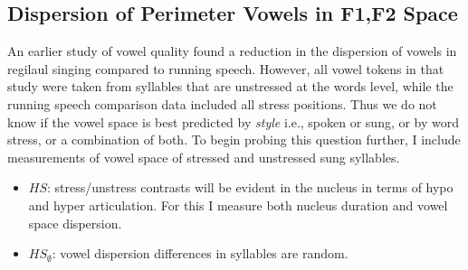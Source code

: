 \subsection{Dispersion of Perimeter Vowels in F1,F2 Space}
An earlier study of vowel quality \cite{ross1992} found a reduction in the dispersion of vowels in regilaul singing compared to running speech. However, all vowel tokens in that study were taken from syllables that are unstressed at the words level, while the running speech comparison data included all stress positions. Thus we do not know if the vowel space is best predicted by {\it style} i.e., spoken or sung, or by word stress, or a combination of both. 
To begin probing this question further, I include measurements of vowel space of stressed and unstressed sung syllables. 
	\begin{itemize}
	\item \(HS\): stress/unstress contrasts will be evident in the nucleus in terms of hypo and hyper articulation. For this I measure both nucleus duration and vowel space dispersion. 
	\item \(HS_{\emptyset}\): vowel dispersion differences in syllables are random. 
	\end{itemize}




